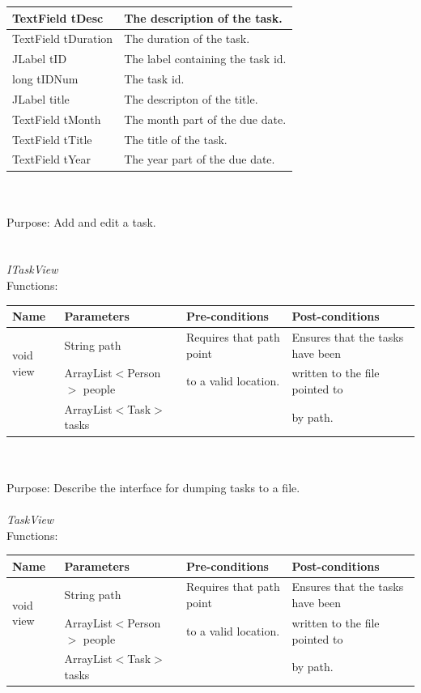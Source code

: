 \begin{tabular}{| l | l |}
\hline
TextField tDesc & The description of the task.\\
\hline
TextField tDuration & The duration of the task.\\
\hline
JLabel tID & The label containing the task id.\\
\hline
long tIDNum & The task id.\\
\hline
JLabel title & The descripton of the title.\\
\hline
TextField tMonth & The month part of the due date.\\
\hline
TextField tTitle & The title of the task.\\
\hline
TextField tYear & The year part of the due date.\\
\hline
\end{tabular}\\
\\
Purpose: Add and edit a task.\\
\\
\\
\emph{ITaskView}\\
Functions:\\
\begin{tabular}{| l | l | l | l |}
\hline
Name & Parameters & Pre-conditions & Post-conditions\\
\hline
\multirow{2}{*}{void view} & String path                                 & Requires that path point & Ensures that the tasks have been\\ 
			         & ArrayList$<$Person$>$ people & to a valid location.          & written to the file pointed to\\ 
                                             & ArrayList$<$Task$>$ tasks       &                                         & by path.
\\
\hline
\end{tabular}\\
\\
Purpose: Describe the interface for dumping tasks to a file.
\\
\\
\emph{TaskView}\\
Functions:\\
\begin{tabular}{| l | l | l | l |}
\hline
Name & Parameters & Pre-conditions & Post-conditions\\
\hline
\multirow{2}{*}{void view} & String path                                 & Requires that path point & Ensures that the tasks have been\\ 
			        & ArrayList$<$Person$>$ people & to a valid location.          & written to the file pointed to\\ 
                                            & ArrayList$<$Task$>$ tasks       &                                         & by path.
\\
\hline
\end{tabular}

